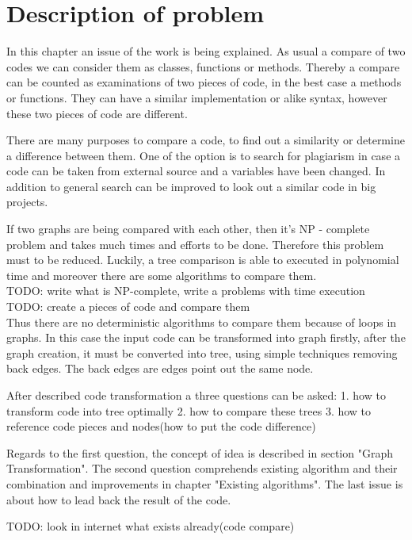 \documentclass{report}
\begin{document}
\chapter{Description of problem}
\label{cha:Description}

In this chapter an issue of the work is being explained. As usual a compare of two codes we can consider them as classes, functions or methods. Thereby a compare can be counted as examinations of two pieces of code, in the best case a methods or functions. They can have a similar implementation or alike syntax, however these two pieces of code are different.

There are many purposes to compare a code, to find out a similarity or determine a difference between them. One of the option is to search for plagiarism in case a code can be taken from external source and a variables have been changed. In addition to general search can be improved to look out a similar code in big projects.

If two graphs are being compared with each other, then it's NP - complete problem and takes much times and efforts to be done. Therefore this problem must to be reduced. Luckily, a tree comparison is able to executed in polynomial time and moreover there are some algorithms to compare them.
\\
TODO: write what is NP-complete, write a problems with time execution \\
TODO: create a pieces of code and compare them
\\

Thus there are no deterministic algorithms to compare them because of loops in graphs. In this case the input code can be transformed into graph firstly, after the graph creation, it must be converted into tree, using simple techniques removing back edges. The back edges are edges point out the same node. 

After described code transformation a three questions can be asked:
 1. how to transform code into tree optimally
 2. how to compare these trees
 3. how to reference code pieces and nodes(how to put the code difference) 

Regards to the first question, the concept of idea is described in section "Graph Transformation". The second question comprehends existing algorithm and their combination and improvements in chapter "Existing algorithms". The last issue is about how to lead back the result of the code.

TODO: look in internet what exists already(code compare)
\end{document}
